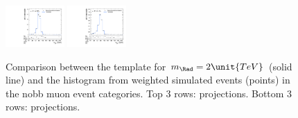 \begin{figure}[htpb]
  \includegraphics[width=0.2\textwidth]{fig/analysisAppendix/templateVsReco_VBFRadToWW2000_r0_MJ_mu_HP_vbf_HDy.pdf}
  \includegraphics[width=0.2\textwidth]{fig/analysisAppendix/templateVsReco_VBFRadToWW2000_r0_MJ_mu_LP_vbf_HDy.pdf}\\
  \caption{
    Comparison between the \VBF\RadtoWW template for $m_{\Rad}=2\unit{TeV}$ (solid line) and the histogram from weighted simulated events (points) in the nobb muon event categories.
    Top 3 rows: \MVV projections.
    Bottom 3 rows: \MJ projections.
  }
  \label{fig:1dtemplateVsReco_VBFRadToWW2000}
\end{figure}

